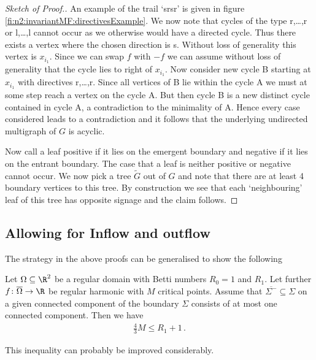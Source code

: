 \begin{proof}[Sketch of Proof.]
  An example of the trail `srsr' is given in figure \ref{fi:n2:invariantMF:directivesExample}.
  We now note that cycles of the type r,\dots,r or l,\dots,l
  cannot occur as we otherwise would have a directed cycle. Thus there exists a vertex where the chosen direction is s. 
  Without loss of generality this vertex is $x_{i_1}$.
  Since we can swap $f$ with $-f$ we can assume without loss of generality that the cycle lies to right of $x_{i_1}$.
  Now consider new cycle B starting at $x_{i_1}$ with directives r,\dots,r.
  Since all vertices of B lie within the cycle A we must at some step reach a vertex on the cycle A. But then cycle B is a new distinct cycle
  contained in cycle A, a contradiction to the minimality of A.
  Hence every case considered leads to a contradiction and it follows that the underlying undirected multigraph of $G$
  is acyclic.
  
  Now call a leaf positive if it lies on the emergent boundary and
  negative if it lies on the entrant boundary. The case that a leaf is neither positive or negative cannot occur.
  We now pick a tree $\widetilde{G}$ out of $G$ and note that
  there are at least 4 boundary vertices to this tree.
  By construction we see that each `neighbouring' leaf of this tree
  has opposite signage and the claim follows.
\end{proof}

\subsection{Allowing for Inflow and outflow}

The strategy in the above proofs can be generalised to show the following
\begin{conjecture}
  Let $\Omega\subseteq\R^2$ be a regular domain with Betti numbers $R_0=1$ and $R_1$.
  Let further $f\colon\overline{\Omega}\to\R$ be regular harmonic with $M$ critical points.
  Assume that 
  $\overline{\Sigma^-}\subseteq\Sigma$ on a given connected component 
  of the boundary $\Sigma$
  consists of at most one connected component. Then we have
  \begin{align*}
    \frac{4}{3}M\leq R_1+1\,.
  \end{align*}
\end{conjecture}
This inequality can probably be improved considerably.


